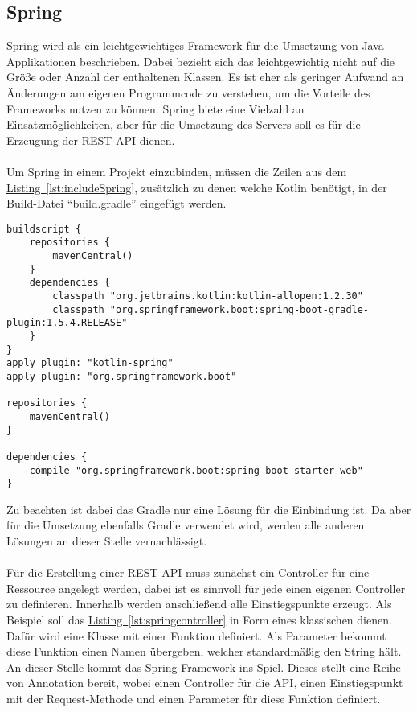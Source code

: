 \subsection{Spring}\label{sec:bibspring}
Spring wird als ein leichtgewichtiges Framework für die Umsetzung von Java Applikationen beschrieben. Dabei bezieht sich das leichtgewichtig nicht auf die Größe oder Anzahl der enthaltenen Klassen. Es ist eher als geringer Aufwand an Änderungen am eigenen Programmcode zu verstehen, um die Vorteile des Frameworks nutzen zu können. \cite{proSpring5} Spring biete eine Vielzahl an Einsatzmöglichkeiten, aber für die Umsetzung des Servers soll es für die Erzeugung der \gls{REST}-\gls{API} dienen.\\
\\
Um Spring in einem Projekt einzubinden, müssen die Zeilen aus dem \hyperref[lst:includeSpring]{Listing~\ref{lst:includeSpring}}, zusätzlich zu denen welche Kotlin benötigt, in der Build-Datei \enquote{build.gradle} eingefügt werden.
\begin{lstlisting}[style=lstStyleFramed, language=Gradle, caption={Einbindung des Spring Framework mithilfe von Gradle}, label=lst:includeSpring, float]
buildscript {
	repositories {
		mavenCentral()
	}
	dependencies {
		classpath "org.jetbrains.kotlin:kotlin-allopen:1.2.30"
		classpath "org.springframework.boot:spring-boot-gradle-plugin:1.5.4.RELEASE"
	}
}
apply plugin: "kotlin-spring"
apply plugin: "org.springframework.boot"

repositories {
	mavenCentral()
}

dependencies {
	compile "org.springframework.boot:spring-boot-starter-web"
}
\end{lstlisting}
Zu beachten ist dabei das Gradle nur eine Lösung für die Einbindung ist. Da aber für die Umsetzung ebenfalls Gradle verwendet wird, werden alle anderen Lösungen an dieser Stelle vernachlässigt.\\
\\ 
Für die Erstellung einer \gls{REST} \gls{API} muss zunächst ein Controller für eine Ressource angelegt werden, dabei ist es sinnvoll für jede einen eigenen Controller zu definieren. Innerhalb werden anschließend alle Einstiegspunkte erzeugt. Als Beispiel soll das \hyperref[lst:springcontroller]{Listing~\ref{lst:springcontroller}} in Form eines klassischen  dienen. Dafür wird eine Klasse  mit einer Funktion  definiert. Als Parameter bekommt diese Funktion einen Namen übergeben, welcher standardmäßig den String  hält. An dieser Stelle kommt das Spring Framework ins Spiel. Dieses stellt eine Reihe von Annotation bereit, wobei  einen Controller für die \gls{API},  einen Einstiegspunkt mit der Request-Methode  und  einen Parameter für diese Funktion definiert. 
